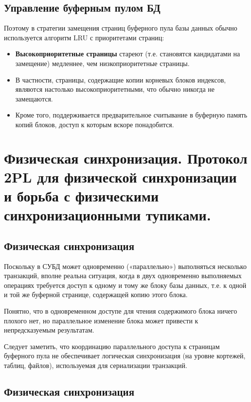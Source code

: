 \documentclass[a4paper,12pt]{article}
\begin{document}
\subsection{Управление буферным пулом БД}

Поэтому в стратегии замещения страниц буферного пула базы данных обычно используется алгоритм LRU с приоритетами страниц:
\begin{itemize}
    \item \textbf{Высокоприоритетные страницы} стареют (т.е. становятся кандидатами на замещение) медленнее, чем низкоприоритетные страницы.
    \item В частности, страницы, содержащие копии корневых блоков индексов, являются настолько высокоприоритетными, что обычно никогда не замещаются.
    \item Кроме того, поддерживается предварительное считывание в буферную память копий блоков, доступ к которым вскоре понадобится.
\end{itemize}

\section{Физическая синхронизация. Протокол 2PL для физической синхронизации и борьба с физическими синхронизационными тупиками.}

\subsection{Физическая синхронизация}

Поскольку в СУБД может одновременно («параллельно») выполняться несколько транзакций, вполне реальна ситуация, когда в двух одновременно выполняемых операциях требуется доступ к одному и тому же блоку базы данных, т.е. к одной и той же буферной странице, содержащей копию этого блока.

Понятно, что в одновременном доступе для чтения содержимого блока ничего плохого нет, но параллельное изменение блока может привести к непредсказуемым результатам.

Следует заметить, что координацию параллельного доступа к страницам буферного пула не обеспечивает логическая синхронизация (на уровне кортежей, таблиц, файлов), используемая для сериализации транзакций.

\subsection{Физическая синхронизация}
\end{document}
